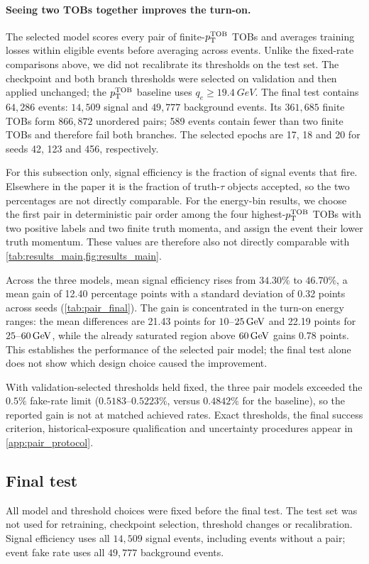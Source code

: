 \paragraph{Seeing two TOBs together improves the turn-on.}
The selected model scores every pair of finite-$p_{\mathrm{T}}^{\mathrm{TOB}}$ TOBs and averages
training losses within eligible events before averaging across events. Unlike the fixed-rate comparisons above,
we did not recalibrate its thresholds on the test set. The checkpoint and both
branch thresholds were selected on validation and then applied unchanged; the
$p_{\mathrm{T}}^{\mathrm{TOB}}$ baseline uses
$q_e\geq\SI{19.4}{GeV}$. The final test contains $64{,}286$ events:
$14{,}509$ signal and $49{,}777$ background events. Its $361{,}685$ finite
TOBs form $866{,}872$ unordered pairs; 589 events contain fewer than two finite
TOBs and therefore fail both branches. The selected epochs are 17, 18 and 20
for seeds 42, 123 and 456, respectively.

For this subsection only, signal efficiency is the fraction of signal events
that fire. Elsewhere in the paper it is the fraction of truth-$\tau$ objects
accepted, so the two percentages are not directly comparable. For the
energy-bin results, we choose the first pair in deterministic pair order
among the four highest-$p_{\mathrm{T}}^{\mathrm{TOB}}$ TOBs with two positive labels and two finite
truth momenta, and assign the event their lower truth momentum. These
values are therefore also not directly comparable with
\cref{tab:results_main,fig:results_main}.



Across the three models, mean signal efficiency rises from $34.30\%$ to
$46.70\%$, a mean gain of 12.40 percentage points with a standard deviation of
0.32 points across seeds
(\cref{tab:pair_final}). The gain is concentrated in the turn-on energy
ranges: the mean differences are 21.43 points for $10$--$25\,\mathrm{GeV}$ and
22.19 points for $25$--$60\,\mathrm{GeV}$, while the already saturated region above
$60\,\mathrm{GeV}$ gains 0.78 points. This establishes the performance of the selected
pair model; the final test alone does not show which design choice caused the
improvement.

With validation-selected thresholds held fixed, the three pair models exceeded
the $0.5\%$ fake-rate limit ($0.5183$--$0.5223\%$, versus $0.4842\%$ for the
baseline), so the reported gain is not at matched achieved rates.
Exact thresholds, the final success criterion, historical-exposure
qualification and uncertainty procedures appear in \cref{app:pair_protocol}.

\subsection{Final test}
All model and threshold choices were fixed before the final test. The test set
was not used for retraining, checkpoint selection, threshold changes or
recalibration. Signal efficiency uses all $14{,}509$ signal events, including
events without a pair; event fake rate uses all $49{,}777$ background events.

